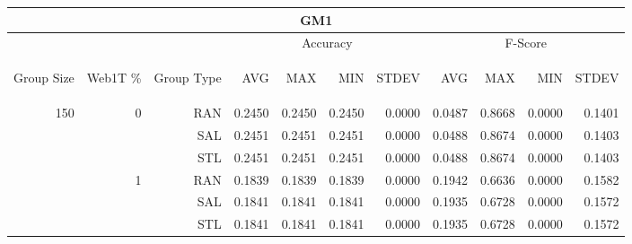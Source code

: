 \begin{center}
\begin{table}[htbp]
\begin{tabular}{ | r | r | r | r | r | r | r | r | r | r | r |}
\hline
\multicolumn{11}{|c|}{GM1}\\
\hline
 & & & \multicolumn{4}{|c|}{Accuracy} & \multicolumn{4}{|c|}{F-Score}\\ \cline{4-11}
\begin{sideways}Group Size\end{sideways} & \begin{sideways}Web1T \%\end{sideways} & \begin{sideways}Group Type\end{sideways} & \begin{sideways}AVG\end{sideways} & \begin{sideways}MAX\end{sideways} & \begin{sideways}MIN\end{sideways} & \begin{sideways}STDEV\end{sideways} & \begin{sideways}AVG\end{sideways} & \begin{sideways}MAX\end{sideways} & \begin{sideways}MIN\end{sideways} & \begin{sideways}STDEV\end{sideways}\\
\hline
\multirow{18}{*}{150}
 & \multirow{3}{*}{0} & RAN & 0.2450 & 0.2450 & 0.2450 & 0.0000 & 0.0487 & 0.8668 & 0.0000 & 0.1401\\ \cline{3-11}
 &   & SAL & 0.2451 & 0.2451 & 0.2451 & 0.0000 & 0.0488 & 0.8674 & 0.0000 & 0.1403\\ \cline{3-11}
 &   & STL & 0.2451 & 0.2451 & 0.2451 & 0.0000 & 0.0488 & 0.8674 & 0.0000 & 0.1403\\ \cline{2-11}
 & \multirow{3}{*}{1} & RAN & 0.1839 & 0.1839 & 0.1839 & 0.0000 & 0.1942 & 0.6636 & 0.0000 & 0.1582\\ \cline{3-11}
 &   & SAL & 0.1841 & 0.1841 & 0.1841 & 0.0000 & 0.1935 & 0.6728 & 0.0000 & 0.1572\\ \cline{3-11}
 &   & STL & 0.1841 & 0.1841 & 0.1841 & 0.0000 & 0.1935 & 0.6728 & 0.0000 & 0.1572\\ \cline{2-11}

\end{tabular}
\end{table}
\end{center}
